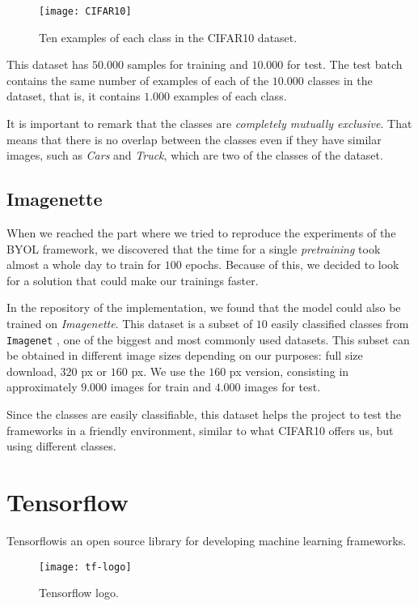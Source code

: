 \begin{figure}[H]
    \centering 
    \texttt{[image: CIFAR10]}
    \caption{Ten examples of each class in the CIFAR10 dataset. }
\end{figure}
This dataset has $50.000$ samples for training and $10.000$ for test. The test batch contains the same number of examples of each of the $10.000$ classes in the dataset, that is, it contains $1.000$ examples of each class. 

It is important to remark that the classes are \emph{completely mutually exclusive}. That means that there is no overlap between the classes even if they have similar images, such as \emph{Cars} and \emph{Truck}, which are two of the classes of the dataset.

\subsection{Imagenette}

When we reached the part where we tried to reproduce the experiments of the BYOL framework, we discovered that the time for a single \emph{pretraining} took almost a whole day to train for $100$ epochs. Because of this, we decided to look for a solution that could make our trainings faster.

In the repository of the implementation, we found that the model could also be trained on \emph{Imagenette}. This dataset is a subset of $10$ easily classified classes from \lstinline{Imagenet} \citep{russakovsky2015imagenet}, one of the biggest and most commonly used datasets. This subset can be obtained in different image sizes depending on our purposes: full size download, $320$ px or $160$ px. We use the $160$ px version, consisting in approximately $9.000$ images for train and $4.000$ images for test.

Since the classes are easily classifiable, this dataset helps the project to test the frameworks in a friendly environment, similar to what CIFAR10 offers us, but using different classes.



\section{Tensorflow}



Tensorflow\footnotemark is an open source library for developing machine learning frameworks.  

\begin{wrapfigure}{r}{5cm}
    \caption{Tensorflow logo.}
    \texttt{[image: tf-logo]}
\end{wrapfigure}

